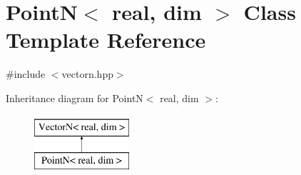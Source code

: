 \hypertarget{classPointN}{
\section{PointN$<$ real, dim $>$ Class Template Reference}
\label{classPointN}
}


{\ttfamily \#include $<$vectorn.hpp$>$}

Inheritance diagram for PointN$<$ real, dim $>$:\begin{figure}[H]
\begin{center}
\leavevmode
\includegraphics[height=2.000000cm]{classPointN}
\end{center}
\end{figure}

